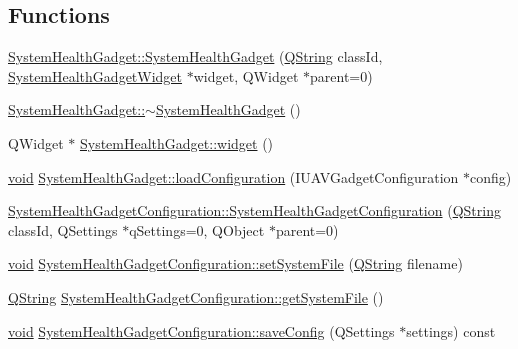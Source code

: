 \subsection*{\-Functions}
\begin{DoxyCompactItemize}
\item 
\hyperlink{group___system_health_plugin_ga87aa19680bf60a11eb4bd50c7df04992}{\-System\-Health\-Gadget\-::\-System\-Health\-Gadget} (\hyperlink{group___u_a_v_objects_plugin_gab9d252f49c333c94a72f97ce3105a32d}{\-Q\-String} class\-Id, \hyperlink{class_system_health_gadget_widget}{\-System\-Health\-Gadget\-Widget} $\ast$widget, \-Q\-Widget $\ast$parent=0)
\item 
\hyperlink{group___system_health_plugin_ga2212c1f05f7363aaf794f85bb9e7823c}{\-System\-Health\-Gadget\-::$\sim$\-System\-Health\-Gadget} ()
\item 
\-Q\-Widget $\ast$ \hyperlink{group___system_health_plugin_ga3732714b9995ed833047882c7e723dc0}{\-System\-Health\-Gadget\-::widget} ()
\item 
\hyperlink{group___u_a_v_objects_plugin_ga444cf2ff3f0ecbe028adce838d373f5c}{void} \hyperlink{group___system_health_plugin_gab876671a49f1abc2e7b8edbec5c0eaa1}{\-System\-Health\-Gadget\-::load\-Configuration} (\-I\-U\-A\-V\-Gadget\-Configuration $\ast$config)
\item 
\hyperlink{group___system_health_plugin_gae6898d57714b4d34fc5ddc5e47e3af2e}{\-System\-Health\-Gadget\-Configuration\-::\-System\-Health\-Gadget\-Configuration} (\hyperlink{group___u_a_v_objects_plugin_gab9d252f49c333c94a72f97ce3105a32d}{\-Q\-String} class\-Id, \-Q\-Settings $\ast$q\-Settings=0, \-Q\-Object $\ast$parent=0)
\item 
\hyperlink{group___u_a_v_objects_plugin_ga444cf2ff3f0ecbe028adce838d373f5c}{void} \hyperlink{group___system_health_plugin_gae877ad975152eb4b4df1076138610d0e}{\-System\-Health\-Gadget\-Configuration\-::set\-System\-File} (\hyperlink{group___u_a_v_objects_plugin_gab9d252f49c333c94a72f97ce3105a32d}{\-Q\-String} filename)
\item 
\hyperlink{group___u_a_v_objects_plugin_gab9d252f49c333c94a72f97ce3105a32d}{\-Q\-String} \hyperlink{group___system_health_plugin_ga4807e799ef6d19b807497d0c74295b32}{\-System\-Health\-Gadget\-Configuration\-::get\-System\-File} ()
\item 
\hyperlink{group___u_a_v_objects_plugin_ga444cf2ff3f0ecbe028adce838d373f5c}{void} \hyperlink{group___system_health_plugin_gabbb3ed58da74764c327a4933fbc81a53}{\-System\-Health\-Gadget\-Configuration\-::save\-Config} (\-Q\-Settings $\ast$settings) const 

\end{DoxyCompactItemize}
